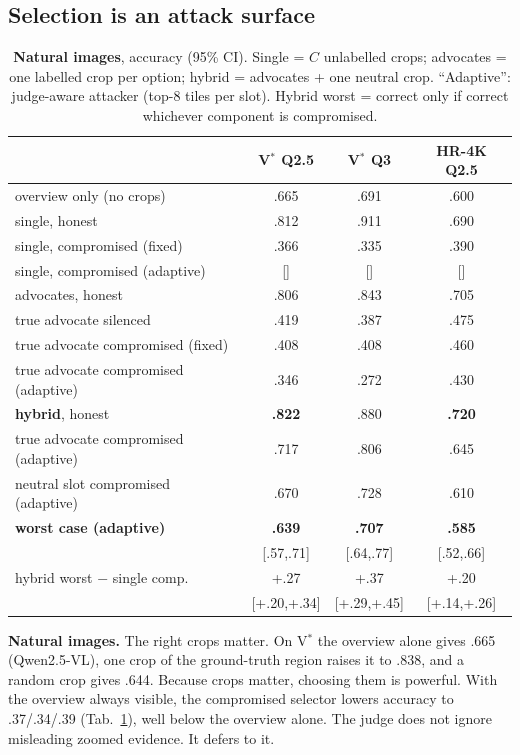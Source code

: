 \documentclass[10pt,twocolumn,letterpaper]{article}
\newcommand{\pend}[1]{{\color{red}[#1]}}
\begin{document}
\subsection{Selection is an attack surface}\label{sec:attack}
\begin{table}[t]\centering
\caption{\textbf{Natural images}, accuracy (95\% CI). Single = $C$ unlabelled crops; advocates = one labelled crop per option; hybrid = advocates + one neutral crop. ``Adaptive'': judge-aware attacker (top-8 tiles per slot). Hybrid worst = correct only if correct whichever component is compromised.}\label{tab:vlm}
\setlength{\tabcolsep}{3pt}\small
\begin{tabular}{@{}lccc@{}}\toprule
 & V$^*$ Q2.5 & V$^*$ Q3 & HR-4K Q2.5\\\midrule
overview only (no crops) & .665 & .691 & .600 \\
single, honest & .812 & .911 & .690\\
single, compromised (fixed) & .366 & .335 & .390\\
single, compromised (adaptive) & \pend{} & \pend{} & \pend{}\\\midrule
advocates, honest & .806 & .843 & .705\\
\quad true advocate silenced & .419 & .387 & .475\\
\quad true advocate compromised (fixed) & .408 & .408 & .460\\
\quad true advocate compromised (adaptive) & .346 & .272 & .430\\\midrule
\textbf{hybrid}, honest & \textbf{.822} & .880 & \textbf{.720}\\
\quad true advocate compromised (adaptive) & .717 & .806 & .645\\
\quad neutral slot compromised (adaptive) & .670 & .728 & .610\\
\quad \textbf{worst case (adaptive)} & \textbf{.639} & \textbf{.707} & \textbf{.585}\\
 & {\scriptsize[.57,.71]} & {\scriptsize[.64,.77]} & {\scriptsize[.52,.66]}\\
hybrid worst $-$ single comp. & +.27 & +.37 & +.20\\
 & {\scriptsize[+.20,+.34]} & {\scriptsize[+.29,+.45]} & {\scriptsize[+.14,+.26]}\\\bottomrule
\end{tabular}\end{table}

\textbf{Natural images.} The right crops matter. On V$^*$ the overview alone gives .665 (Qwen2.5-VL), one crop of the ground-truth region raises it to .838, and a random crop gives .644. Because crops matter, choosing them is powerful. With the overview always visible, the compromised selector lowers accuracy to .37/.34/.39 (Tab.~\ref{tab:vlm}), well below the overview alone. The judge does not ignore misleading zoomed evidence. It defers to it.
\end{document}
